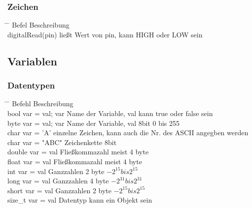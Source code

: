 \documentclass[10pt,a4paper,oneside]{article}
\begin{document}
\subsubsection{Zeichen}
\begin{tabbing}
  \hspace*{1mm} \=\hspace{50mm} \= \kill
  \>Befel \>Beschreibung \\
  \>digitalRead(pin) \> ließt Wert von pin, kann HIGH oder LOW sein \\
\end{tabbing}


\subsection{Variablen}

\subsubsection{Datentypen}
\begin{tabbing}
  \hspace*{1mm} \=\hspace{50mm} \= \kill
  \>Befehl \>Beschreibung \\
  \>bool var = val; \> var Name der Variable, val kann true oder false sein\\
  \>byte var = val; \> var Name der Variable, val 8bit 0 bis 255\\ 
  \>char var = 'A' \> einzelne Zeichen, kann auch die Nr. des ASCII angegben werden\\ 
  \>char var = "ABC" \>Zeichenkette 8bit\\ 
  \>double var = val \> Fließkommazahl meist 4 byte\\ 
  \>float var = val \> Fließkommazahl meist 4 byte\\ 
  \>int var = val \> Ganzzahlen 2 byte 
    \begin{math} 
      -2^{15} bis 2^{15}
    \end{math}\\ 
  \>long var = val \> Ganzzahlen 4 byte 
    \begin{math}
      -2^{31} bis 2^{31}
    \end{math}\\ 
  \>short var = val \> Ganzzahlen 2 byte 
    \begin{math}
      -2^{15} bis 2^{15}
    \end{math}\\ 
  \>size\_t var = val \> Datentyp kann ein Objekt sein\\ 
\end{tabbing}
\end{document}

